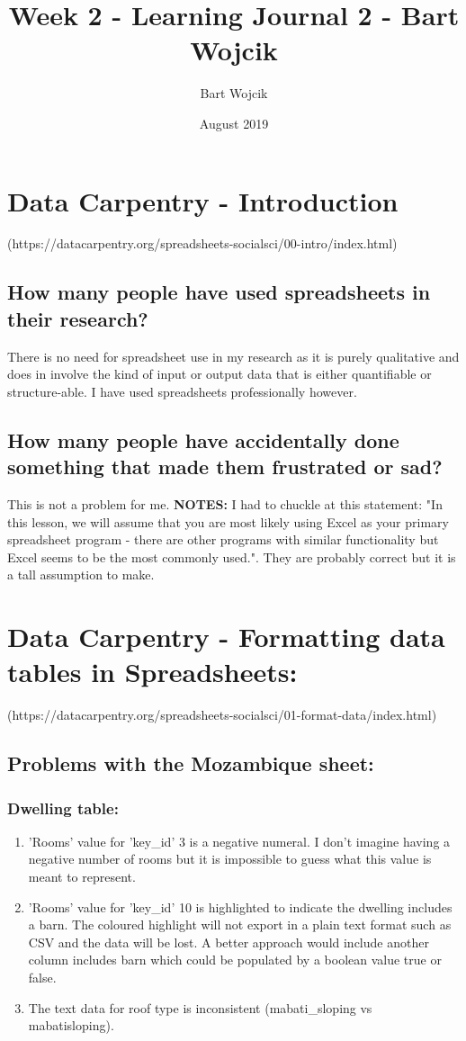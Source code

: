 \documentclass{article}
\title{Week 2 - Learning Journal 2 - Bart Wojcik}
\author{Bart Wojcik}
\date{August 2019}
\begin{document}
\maketitle

\section{Data Carpentry - Introduction}
(https://datacarpentry.org/spreadsheets-socialsci/00-intro/index.html)
\subsection{How many people have used spreadsheets in their research?}
There is no need for spreadsheet use in my research as it is purely qualitative and does in involve the kind of input or output data that is either quantifiable or structure-able. I have used spreadsheets professionally however.
\subsection{How many people have accidentally done something that made them frustrated or sad?}
This is not a problem for me.\newline
\newline
\textbf{NOTES:} I had to chuckle at this statement: "In this lesson, we will assume that you are most likely using Excel as your primary spreadsheet program - there are other programs with similar functionality but Excel seems to be the most commonly used.". They are probably correct but it is a tall assumption to make.

\section{Data Carpentry - Formatting data tables in Spreadsheets:}
(https://datacarpentry.org/spreadsheets-socialsci/01-format-data/index.html)

\subsection{Problems with the Mozambique sheet:}
\subsubsection{Dwelling table:}
\begin{enumerate}
    \item 'Rooms' value for 'key\_id' 3 is a negative numeral. I don't imagine having a negative number of rooms but it is impossible to guess what this value is meant to represent.
    \item 'Rooms' value for 'key\_id' 10 is highlighted to indicate the dwelling includes a barn. The coloured highlight will not export in a plain text format such as CSV and the data will be lost. A better approach would include another column includes barn which could be populated by a boolean value true or false.
    \item The text data for roof type is inconsistent (mabati\_sloping vs mabatisloping).
\end{enumerate}
\end{document}
